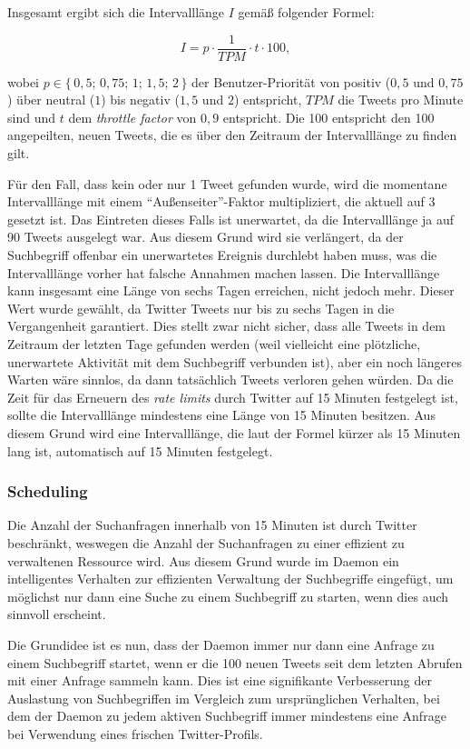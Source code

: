 Insgesamt ergibt sich die Intervalllänge $I$ gemäß folgender Formel:

$$I = p \cdot \frac{1}{TPM} \cdot t \cdot 100,$$

wobei $p \in \{\,0,5;\,0,75;\,1;\,1,5;\,2\,\}$ der Benutzer-Priorität von positiv ($0,5$ und $0,75$) über neutral ($1$) bis negativ ($1,5$ und $2$) entspricht, $TPM$ die Tweets pro Minute sind und $t$ dem \textit{throttle factor} von $0,9$ entspricht.
Die 100 entspricht den 100 angepeilten, neuen Tweets, die es über den Zeitraum der Intervalllänge zu finden gilt.

Für den Fall, dass kein oder nur 1 Tweet gefunden wurde, wird die momentane Intervalllänge mit einem "`Außenseiter"'-Faktor multipliziert, die aktuell auf 3 gesetzt ist.
Das Eintreten dieses Falls ist unerwartet, da die Intervalllänge ja auf 90 Tweets ausgelegt war.
Aus diesem Grund wird sie verlängert, da der Suchbegriff offenbar ein unerwartetes Ereignis durchlebt haben muss, was die Intervalllänge vorher hat falsche Annahmen machen lassen.
Die Intervalllänge kann insgesamt eine Länge von sechs Tagen erreichen, nicht jedoch mehr. Dieser Wert wurde gewählt, da Twitter Tweets nur bis zu sechs Tagen in die Vergangenheit garantiert.
Dies stellt zwar nicht sicher, dass alle Tweets in dem Zeitraum der letzten Tage gefunden werden (weil vielleicht eine plötzliche, unerwartete Aktivität mit dem Suchbegriff verbunden ist), aber ein noch längeres Warten wäre sinnlos, da dann tatsächlich Tweets verloren gehen würden.
Da die Zeit für das Erneuern des \textit{rate limits} durch Twitter auf 15 Minuten festgelegt ist, sollte die Intervalllänge mindestens eine Länge von 15 Minuten besitzen.
Aus diesem Grund wird eine Intervalllänge, die laut der Formel kürzer als 15 Minuten lang ist, automatisch auf 15 Minuten festgelegt.

\subsubsection{Scheduling}
Die Anzahl der Suchanfragen innerhalb von 15 Minuten ist durch Twitter beschränkt, weswegen die Anzahl der Suchanfragen zu einer effizient zu verwaltenen Ressource wird. Aus diesem Grund wurde im Daemon ein intelligentes Verhalten zur effizienten Verwaltung der Suchbegriffe eingefügt, um möglichst nur dann eine Suche zu einem Suchbegriff zu starten, wenn dies auch sinnvoll erscheint.

Die Grundidee ist es nun, dass der Daemon immer nur dann eine Anfrage zu einem Suchbegriff startet, wenn er die 100 neuen Tweets seit dem letzten Abrufen mit einer Anfrage sammeln kann. Dies ist eine signifikante Verbesserung der Auslastung von Suchbegriffen im Vergleich zum ursprünglichen Verhalten, bei dem der Daemon zu jedem aktiven Suchbegriff immer mindestens eine Anfrage bei Verwendung eines frischen Twitter-Profils.

